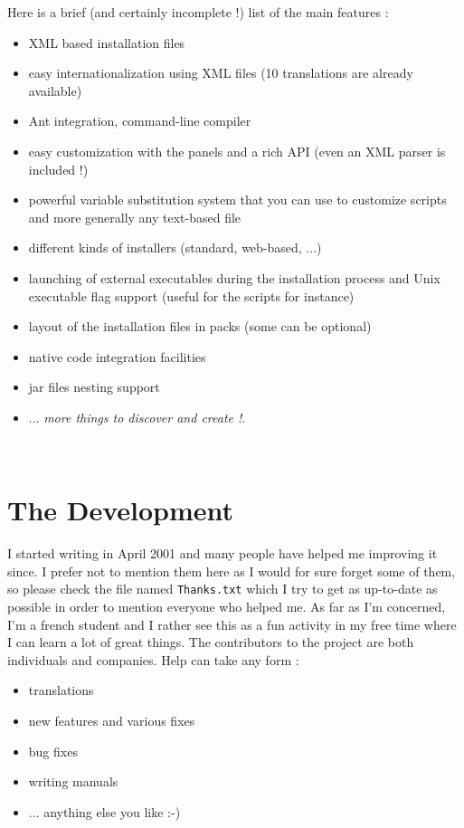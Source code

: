 Here is a brief (and certainly incomplete !) list of the main \IzPack features :
\begin{itemize}
  \item XML based installation files
  \item easy internationalization using XML files (10 translations are already
  available)
  \item Ant integration, command-line compiler
  \item easy customization with the panels and a rich API (even an XML parser is
  included !)
  \item powerful variable substitution system that you can use to customize
  scripts and more generally any text-based file
  \item different kinds of installers (standard, web-based, ...)
  \item launching of external executables during the installation process and Unix
  executable flag support (useful for the scripts for instance)
  \item layout of the installation files in packs (some can be optional)
  \item native code integration facilities
  \item jar files nesting support
  \item ... \textsl{more things to discover and create !}.
\end{itemize}\

\section*{The Development}

I started writing \IzPack in April 2001 and many people have helped me
improving it since. I prefer not to mention them here as I would for sure forget
some of them, so please check the file named \texttt{Thanks.txt} which I try to
get as up-to-date as possible in order to mention everyone who helped me. As far
as I'm concerned, I'm a french student and I rather see this as a fun activity
in my free time where I can learn a lot of great things. The contributors to the
project are both individuals and companies. Help can take any form :
\begin{itemize}
  \item translations
  \item new features and various fixes
  \item bug fixes
  \item writing manuals
  \item ... anything else you like :-)
\end{itemize}\

